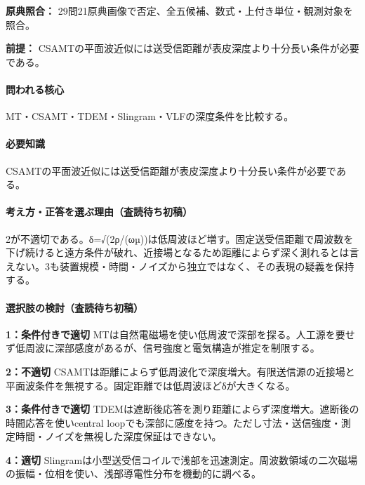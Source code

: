 \noindent\textbf{原典照合：} 29問21原典画像で否定、全五候補、数式・上付き単位・観測対象を照合。\par

\noindent\textbf{前提：} CSAMTの平面波近似には送受信距離が表皮深度より十分長い条件が必要である。\par

\paragraph{問われる核心} MT・CSAMT・TDEM・Slingram・VLFの深度条件を比較する。

\paragraph{必要知識} CSAMTの平面波近似には送受信距離が表皮深度より十分長い条件が必要である。

\paragraph{考え方・正答を選ぶ理由（査読待ち初稿）} 2が不適切である。δ=√(2ρ/(ωµ))は低周波ほど増す。固定送受信距離で周波数を下げ続けると遠方条件が破れ、近接場となるため距離によらず深く測れるとは言えない。3も装置規模・時間・ノイズから独立ではなく、その表現の疑義を保持する。

\paragraph{選択肢の検討（査読待ち初稿）}\mbox{}\par

\noindent\textbf{1：条件付きで適切} MTは自然電磁場を使い低周波で深部を探る。人工源を要せず低周波に深部感度があるが、信号強度と電気構造が推定を制限する。\par

\noindent\textbf{2：不適切} CSAMTは距離によらず低周波化で深度増大。有限送信源の近接場と平面波条件を無視する。固定距離では低周波ほどδが大きくなる。\par

\noindent\textbf{3：条件付きで適切} TDEMは遮断後応答を測り距離によらず深度増大。遮断後の時間応答を使いcentral loopでも深部に感度を持つ。ただし寸法・送信強度・測定時間・ノイズを無視した深度保証はできない。\par

\noindent\textbf{4：適切} Slingramは小型送受信コイルで浅部を迅速測定。周波数領域の二次磁場の振幅・位相を使い、浅部導電性分布を機動的に調べる。\par


